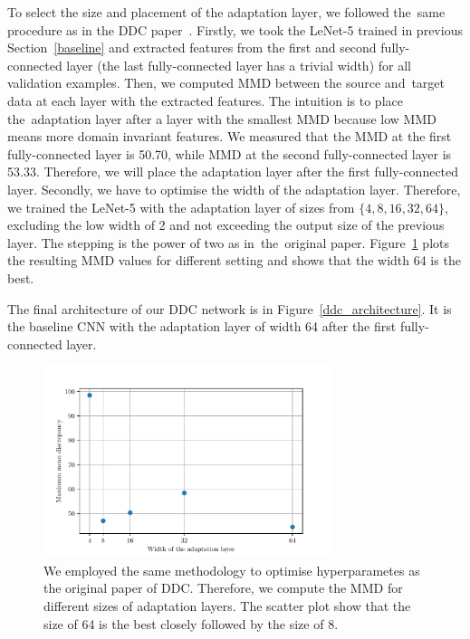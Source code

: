 To select the size and placement of the adaptation layer,
we followed the~same procedure as in the DDC paper~\cite{tzeng2014}.
Firstly, we took the LeNet-5 trained in previous Section~\ref{baseline}
and extracted features from the first and second fully-connected layer
(the last fully-connected layer has a trivial width)
for all validation examples.
Then, we computed MMD between the source and~target data at each layer with the extracted features.
The intuition is to place the~adaptation layer after a layer with the smallest MMD
because low MMD means more domain invariant features.
We measured that the MMD at the first fully-connected layer is 50.70,
while MMD at the second fully-connected layer is 53.33.
Therefore, we will place the adaptation layer after the first fully-connected layer.
Secondly, we have to optimise the width of the adaptation layer.
Therefore, we trained the LeNet-5 with the adaptation layer of sizes
from \(\{4, 8, 16, 32, 64\}\), excluding the low width of 2
and not exceeding the output size of the previous layer.
The stepping is the power of two as in~the~original paper.
Figure~\ref{adaptation_layer} plots the resulting MMD values for different setting
and shows that the width 64 is the best.

The final architecture of our DDC network is in Figure~\ref{ddc_architecture}.
It is the baseline CNN with the adaptation layer of width 64
after the first fully-connected layer.

\begin{figure}
\begin{center}
\includegraphics[width=0.75\textwidth]{img/adaptation_layer_width.pdf}
\end{center}
\caption[Optimisation of the width of the adaptation layer]{
	We employed the same methodology to optimise hyperparametes as the original paper of DDC.
	Therefore, we compute the MMD for different sizes of adaptation layers.
	The scatter plot show that the size of 64 is the best closely followed by the size of 8.
}
\label{adaptation_layer}
\end{figure}

